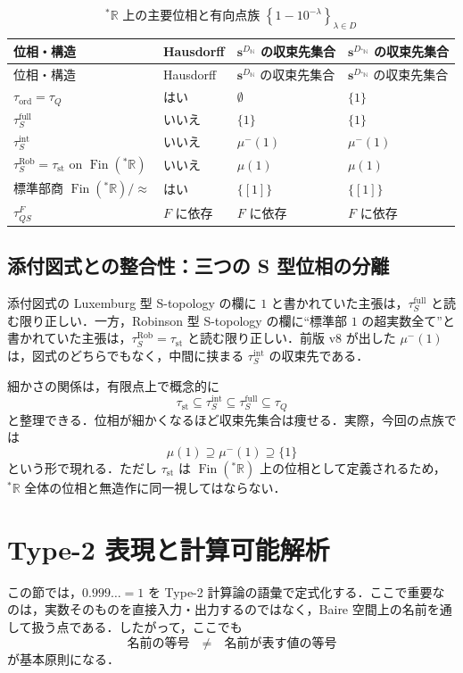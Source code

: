 \documentclass[a4paper,11pt]{ltjsarticle}
\theoremstyle{jpdef}
\theoremstyle{jpthm}
\newcommand{\N}{\mathbb{N}}
\newcommand{\R}{\mathbb{R}}
\newcommand{\Fin}{\operatorname{Fin}}
\newcommand{\DN}{D_{\N}}
\newcommand{\DStarN}{D_{{}^{\ast}\N}}
\newcommand{\seq}[2]{\left\{#1\right\}_{#2}}
\newcommand{\ulim}[1]{{}^{\ast}#1}
\newcommand{\taufullS}{\tau^{\mathrm{full}}_{S}}
\newcommand{\tauintS}{\tau^{\mathrm{int}}_{S}}
\newcommand{\taust}{\tau_{\mathrm{st}}}
\newcommand{\tauRobS}{\tau^{\mathrm{Rob}}_{S}}
\newcommand{\tauQ}{\tau_{Q}}
\newcommand{\tauord}{\tau_{\mathrm{ord}}}
\begin{document}
\begin{longtable}{L{34mm}C{18mm}C{40mm}C{40mm}}
\caption{\(\ulim\R\) 上の主要位相と有向点族 \(\seq{1-10^{-\lambda}}{\lambda\in D}\)}\label{tab:star-topologies}\\
\toprule
位相・構造 & Hausdorff & \(\mathbf s^{\DN}\) の収束先集合 & \(\mathbf s^{\DStarN}\) の収束先集合\\
\midrule
\endfirsthead
\toprule
位相・構造 & Hausdorff & \(\mathbf s^{\DN}\) の収束先集合 & \(\mathbf s^{\DStarN}\) の収束先集合\\
\midrule
\endhead
\(\tauord=\tauQ\) & はい & \(\emptyset\) & \(\{1\}\)\\
\(\taufullS\) & いいえ & \(\{1\}\) & \(\{1\}\)\\
\(\tauintS\) & いいえ & \(\mu^-(1)\) & \(\mu^-(1)\)\\
\(\tauRobS=\taust\) on \(\Fin(\ulim\R)\) & いいえ & \(\mu(1)\) & \(\mu(1)\)\\
標準部商 \(\Fin(\ulim\R)/\approx\) & はい & \(\{[1]\}\) & \(\{[1]\}\)\\
\(\tau^F_{QS}\) & \(F\) に依存 & \(F\) に依存 & \(F\) に依存\\
\bottomrule
\end{longtable}

\subsection{添付図式との整合性：三つの S 型位相の分離}

添付図式の Luxemburg 型 S-topology の欄に \(1\) と書かれていた主張は，\(\taufullS\) と読む限り正しい．一方，Robinson 型 S-topology の欄に``標準部 \(1\) の超実数全て''と書かれていた主張は，\(\tauRobS=\taust\) と読む限り正しい．前版 v8 が出した \(\mu^-(1)\) は，図式のどちらでもなく，中間に挟まる \(\tauintS\) の収束先である．

細かさの関係は，有限点上で概念的に
\[
  \taust\subseteq\tauintS\subseteq\taufullS\subseteq\tauQ
\]
と整理できる．位相が細かくなるほど収束先集合は痩せる．実際，今回の点族では
\[
  \mu(1)\supseteq\mu^-(1)\supseteq\{1\}
\]
という形で現れる．ただし \(\taust\) は \(\Fin(\ulim\R)\) 上の位相として定義されるため，\(\ulim\R\) 全体の位相と無造作に同一視してはならない．
\section{Type-2 表現と計算可能解析}

この節では，\(0.999\ldots=1\) を Type-2 計算論の語彙で定式化する．ここで重要なのは，実数そのものを直接入力・出力するのではなく，Baire 空間上の名前を通して扱う点である．したがって，ここでも
\[
  \text{名前の等号} \quad\ne\quad \text{名前が表す値の等号}
\]
が基本原則になる．
\end{document}
